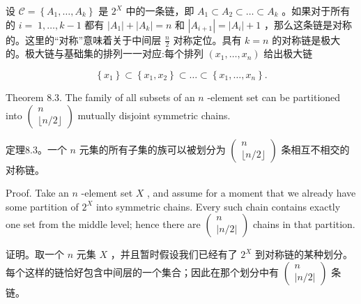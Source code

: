 \documentclass[10pt]{article}
\begin{document}
\begin{tcolorbox}\relax
设 \(\mathcal{C} = \left\{  {{A}_{1},\ldots ,{A}_{k}}\right\}\) 是 \({2}^{X}\) 中的一条链，即 \({A}_{1} \subset  {A}_{2} \subset  \ldots  \subset  {A}_{k}\) 。如果对于所有的 \(i = \; 1,\ldots ,k - 1\) 都有 \(\left| {A}_{1}\right|  + \left| {A}_{k}\right|  = n\) 和 \(\left| {A}_{i + 1}\right|  = \left| {A}_{i}\right|  + 1\) ，那么这条链是对称的。这里的“对称”意味着关于中间层 \(\frac{n}{2}\) 对称定位。具有 \(k = n\) 的对称链是极大的。极大链与基础集的排列一一对应:每个排列 \(\left( {{x}_{1},\ldots ,{x}_{n}}\right)\) 给出极大链
\end{tcolorbox}

\[
\left\{  {x}_{1}\right\}   \subset  \left\{  {{x}_{1},{x}_{2}}\right\}   \subset  \ldots  \subset  \left\{  {{x}_{1},\ldots ,{x}_{n}}\right\}  .
\]

Theorem 8.3. The family of all subsets of an \(n\) -element set can be partitioned into \(\left( \begin{matrix} n \\  \lfloor n/2\rfloor  \end{matrix}\right)\) mutually disjoint symmetric chains.

\begin{tcolorbox}\relax
定理8.3。一个 \(n\) 元集的所有子集的族可以被划分为 \(\left( \begin{matrix} n \\  \lfloor n/2\rfloor  \end{matrix}\right)\) 条相互不相交的对称链。
\end{tcolorbox}

Proof. Take an \(n\) -element set \(X\) , and assume for a moment that we already have some partition of \({2}^{X}\) into symmetric chains. Every such chain contains exactly one set from the middle level; hence there are \(\left( \begin{matrix} n \\  \left| {n/2}\right|  \end{matrix}\right)\) chains in that partition.

\begin{tcolorbox}\relax
证明。取一个 \(n\) 元集 \(X\) ，并且暂时假设我们已经有了 \({2}^{X}\) 到对称链的某种划分。每个这样的链恰好包含中间层的一个集合；因此在那个划分中有 \(\left( \begin{matrix} n \\  \left| {n/2}\right|  \end{matrix}\right)\) 条链。
\end{tcolorbox}
\end{document}
